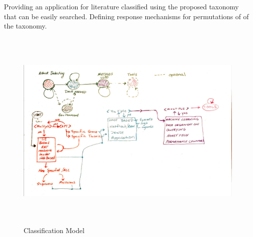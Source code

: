 \documentclass[conference]{IEEEtran}
\begin{document}
Providing an application for literature classified using the proposed taxonomy that can be easily searched. Defining response mechanisms for permutations of of the taxonomy.

\begin{figure}
  \includegraphics[width=\textwidth,height=10cm]{hwdiag.png}
  \caption{Classification Model}
  \label{AAA}
\end{figure}
\end{document}
